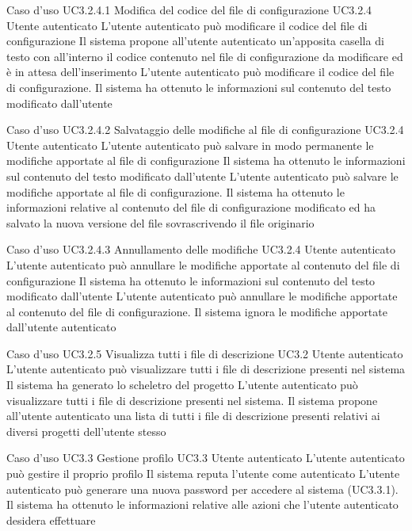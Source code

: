 \UCtitle
{Caso d'uso UC3.2.4.1}
{Modifica del codice del file di configurazione}
\UC
{UC3.2.4}
{Utente autenticato}
{L'utente autenticato può modificare il codice del file di configurazione}
{Il sistema propone all'utente autenticato un'apposita casella di testo con all'interno il codice contenuto nel file di configurazione da modificare ed è in attesa dell'inserimento}
\scenario
{L'utente autenticato può modificare il codice del file di configurazione.}
\post
{Il sistema ha ottenuto le informazioni sul contenuto del testo modificato dall'utente}

\UCtitle
{Caso d'uso UC3.2.4.2}
{Salvataggio delle modifiche al file di configurazione}
\UC
{UC3.2.4}
{Utente autenticato}
{L'utente autenticato può salvare in modo permanente le modifiche apportate al file di configurazione}
{Il sistema ha ottenuto le informazioni sul contenuto del testo modificato dall'utente}
\scenario
{L'utente autenticato può salvare le modifiche apportate al file di configurazione.}
\post
{Il sistema ha ottenuto le informazioni relative al contenuto del file di configurazione modificato ed ha salvato la nuova versione del file sovrascrivendo il file originario}

\UCtitle
{Caso d'uso UC3.2.4.3}
{Annullamento delle modifiche}
\UC
{UC3.2.4}
{Utente autenticato}
{L'utente autenticato può annullare le modifiche apportate al contenuto del file di configurazione}
{Il sistema ha ottenuto le informazioni sul contenuto del testo modificato dall'utente}
\scenario
{L'utente autenticato può annullare le modifiche apportate al contenuto del file di configurazione.}
\post
{Il sistema ignora le modifiche apportate dall'utente autenticato}

\UCtitle
{Caso d'uso UC3.2.5}
{Visualizza tutti i file di descrizione}
\UC
{UC3.2}
{Utente autenticato}
{L'utente autenticato può visualizzare tutti i file di descrizione presenti nel sistema}
{Il sistema ha generato lo scheletro del progetto}
\scenario
{L'utente autenticato può visualizzare tutti i file di descrizione presenti nel sistema.}
\post
{Il sistema propone all'utente autenticato una lista di tutti i file di descrizione presenti relativi ai diversi progetti dell'utente stesso}


\UCtitle
{Caso d'uso UC3.3}
{Gestione profilo}
\UC
{UC3.3}
{Utente autenticato}
{L'utente autenticato può gestire il proprio profilo}
{Il sistema reputa l'utente come autenticato}
\scenario
{L'utente autenticato può generare una nuova password per accedere al sistema (UC3.3.1).}
\post
{Il sistema ha ottenuto le informazioni relative alle azioni che l'utente autenticato desidera effettuare}

